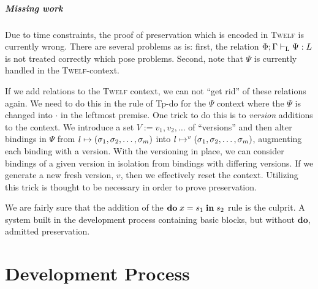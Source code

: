 \documentclass[a4paper, oneside, 10pt, draft]{memoir}
\newcommand{\twelf}{\textsc{Twelf}}
\begin{document}
\paragraph{Missing work}
Due to time constraints, the proof of preservation which is encoded in
\twelf{} is currently wrong. There are several problems as is: first,
the relation $\Phi;\Gamma |-_{\mathrm{L}} \Psi : L$ is not treated correctly
which pose problems. Second, note that $\Psi$ is currently handled in
the \twelf{}-context.

If we add relations to the \twelf{} context, we can not ``get rid'' of
these relations again. We need to do this in the rule of Tp-do for the
$\Psi$ context where the $\Psi$ is changed into $\cdot$ in the
leftmost premise. One trick to do this is to \emph{version} additions
to the context. We introduce a set $V := v_1, v_2, \dotsc$ of
``versions'' and then alter bindings in $\Psi$ from $l \mapsto
(\sigma_1, \sigma_2, \dotsc, \sigma_m)$ into $l \mapsto^{v} (\sigma_1, \sigma_2, \dotsc, \sigma_m)$, augmenting each binding with
a version. With the versioning in place, we can consider bindings of a
given version in isolation from bindings with differing versions. If
we generate a new fresh version, $v$, then we effectively reset the
context. Utilizing this trick is thought to be necessary in order to
prove preservation.

We are fairly sure that the addition of the $\mathbf{do} \; x = s_1 \; \mathbf{in} \; s_2$ rule
is the culprit. A system built in the development process containing
basic blocks, but without $\mathbf{do}$, admitted preservation.

\chapter{Development Process}
\end{document}
